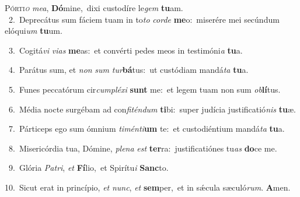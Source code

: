 \lettrine{\initial\textcolor{\initialcolor}{P}}{órti\-\textit{o}\-} \textit{me}\-\textit{a}, \textbf{Dó}\-mine,~\star dixi custodíre le\textit{gem} \textbf{tu}\-am.\\
{\numbfont\textcolor{\numbcolor}{~2.}}~Deprecátus sum fáciem tuam in to\textit{to} \textit{cor}\-\textit{de} \textbf{me}\-o:~\star miserére mei secúndum elóqui\textit{um} \textbf{tu}\-um.\par
{\numbfont\textcolor{\numbcolor}{~3.}}~Cogitá\textit{vi} \textit{vi}\-\textit{as} \textbf{me}\-as:~\star et convérti pedes meos in testimóni\textit{a} \textbf{tu}\-a.\par
{\numbfont\textcolor{\numbcolor}{~4.}}~Parátus sum, et \textit{non} \textit{sum} \textit{tur}\-\textbf{bá}tus:~\star ut custódiam mandá\textit{ta} \textbf{tu}\-a.\par
{\numbfont\textcolor{\numbcolor}{~5.}}~Funes peccatórum cir\-\textit{cum}\-\textit{plé}\textit{xi} \textbf{sunt} me:~\star et legem tuam non sum \textit{ob}\-\textbf{lí}tus.\par
{\numbfont\textcolor{\numbcolor}{~6.}}~Média nocte surgébam ad con\-\textit{fi}\-\textit{tén}\textit{dum} \textbf{ti}\-bi:~\star super judícia justificatió\textit{nis} \textbf{tu}\-æ.\par
{\numbfont\textcolor{\numbcolor}{~7.}}~Párticeps ego sum ómnium \textit{ti}\-\textit{mén}\textit{ti}\textbf{um} te:~\star et custodiéntium mandá\textit{ta} \textbf{tu}\-a.\par
{\numbfont\textcolor{\numbcolor}{~8.}}~Misericórdia tua, Dómine, \textit{ple}\-\textit{na} \textit{est} \textbf{ter}\-ra:~\star justificatiónes tu\textit{as} \textbf{do}\-ce me.\par
{\numbfont\textcolor{\numbcolor}{~9.}}~Glória \textit{Pa}\-\textit{tri}, \textit{et} \textbf{Fí}\-lio,~\star et Spirítu\textit{i} \textbf{Sanc}\-to.\par
{\numbfont\textcolor{\numbcolor}{10.}}~Sicut erat in princípio, \textit{et} \textit{nunc}\-, \textit{et} \textbf{sem}\-per,~\star et in sǽcula sæculó\-\textit{rum}\-. \textbf{A}\-men.\par
